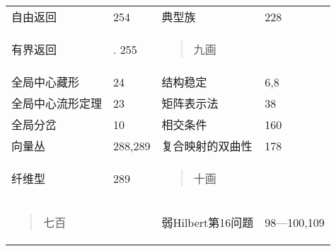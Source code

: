 \documentclass{article}
\begin{document}
\begin{longtable}[]{@{}llll@{}}
\toprule
\endhead
自由返回 & 254 & 典型族 & 228\tabularnewline
\begin{minipage}[t]{0.22\columnwidth}\raggedright
有界返回\strut
\end{minipage} & \begin{minipage}[t]{0.22\columnwidth}\raggedright
. 255\strut
\end{minipage} & \begin{minipage}[t]{0.22\columnwidth}\raggedright
\begin{quote}
九画
\end{quote}\strut
\end{minipage} & \begin{minipage}[t]{0.22\columnwidth}\raggedright
\strut
\end{minipage}\tabularnewline
全局中心藏形 & 24 & 结构稳定 & 6,8\tabularnewline
全局中心流形定理 & 23 & 矩阵表示法 & 38\tabularnewline
全局分岔 & 10 & 相交条件 & 160\tabularnewline
向量丛 & 288,289 & 复合映射的双曲性 & 178\tabularnewline
\begin{minipage}[t]{0.22\columnwidth}\raggedright
纤维型\strut
\end{minipage} & \begin{minipage}[t]{0.22\columnwidth}\raggedright
289\strut
\end{minipage} & \begin{minipage}[t]{0.22\columnwidth}\raggedright
\begin{quote}
十画
\end{quote}\strut
\end{minipage} & \begin{minipage}[t]{0.22\columnwidth}\raggedright
\strut
\end{minipage}\tabularnewline
\begin{minipage}[t]{0.22\columnwidth}\raggedright
\begin{quote}
七百
\end{quote}\strut
\end{minipage} & \begin{minipage}[t]{0.22\columnwidth}\raggedright
\strut
\end{minipage} & \begin{minipage}[t]{0.22\columnwidth}\raggedright
弱Hilbert第16问题\strut
\end{minipage} & \begin{minipage}[t]{0.22\columnwidth}\raggedright
98---100,109\strut
\end{minipage}\tabularnewline

\end{longtable}
\end{document}
